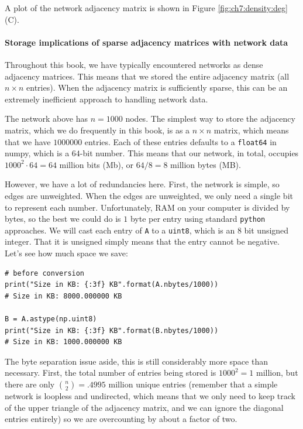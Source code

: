 A plot of the network adjacency matrix is shown in Figure \ref{fig:ch7:density:deg}(C).

\paragraph*{Storage implications of sparse adjacency matrices with network data}

Throughout this book, we have typically encountered networks as dense adjacency matrices. This means that we stored the entire adjacency matrix (all $n \times n$ entries). When the adjacency matrix is sufficiently sparse, this can be an extremely inefficient approach to handling network data. 

The network above has $n=1000$ nodes. The simplest way to store the adjacency matrix, which we do frequently in this book, is as a $n \times n$ matrix, which means that we have $1000000$ entries. Each of these entries defaults to a \texttt{float64} in numpy, which is a $64$-bit number. This means that our network, in total, occupies $1000^2 \cdot 64 = 64$ million bits (Mb), or $64/8 = 8$ million bytes (MB). 

However, we have a lot of redundancies here. First, the network is simple, so edges are unweighted. When the edges are unweighted, we only need a single bit to represent each number. Unfortunately, RAM on your computer is divided by bytes, so the best we could do is $1$ byte per entry using standard \texttt{python} approaches. We will cast each entry of \texttt{A} to a \texttt{uint8}, which is an $8$ bit unsigned integer. That it is unsigned simply means that the entry cannot be negative. Let's see how much space we save:

\begin{lstlisting}[style=python]
# before conversion
print("Size in KB: {:3f} KB".format(A.nbytes/1000))
# Size in KB: 8000.000000 KB

B = A.astype(np.uint8)
print("Size in KB: {:3f} KB".format(B.nbytes/1000))
# Size in KB: 1000.000000 KB
\end{lstlisting}

The byte separation issue aside, this is still considerably more space than necessary. First, the total number of entries being stored is $1000^2 = 1$ million, but there are only $\binom n 2 = .4995$ million unique entries (remember that a simple network is loopless and undirected, which means that we only need to keep track of the upper triangle of the adjacency matrix, and we can ignore the diagonal entries entirely) so we are overcounting by about a factor of two. 

